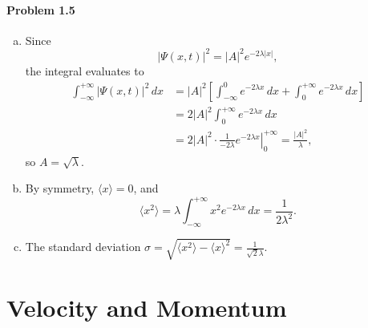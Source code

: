 \documentclass{article}
\begin{document}
\paragraph{Problem 1.5}
\begin{enumerate}[(a)]
  \item Since \[
      |\Psi(x, t)|^2 = |A|^2 e^{-2 \lambda |x|},
    \] the integral evaluates to
    \begin{align*}
      \int_{-\infty}^{+\infty} |\Psi(x, t)|^2 \,dx
      &= |A|^2 \left[
        \int_{-\infty}^0 e^{-2 \lambda x} \,dx +
        \int_0^{+\infty} e^{-2 \lambda x} \,dx
      \right] \\
      &= 2|A|^2 \int_0^{+\infty} e^{-2 \lambda x} \,dx \\
      &= 2|A|^2 \cdot \left.
        \frac{1}{-2\lambda} e^{-2 \lambda x}
      \right|_0^{+\infty} = \frac{|A|^2}{\lambda},
    \end{align*}
    so $A = \sqrt{\lambda}$.
  \item By symmetry, $\langle x \rangle = 0$, and
    \begin{equation*}
      \langle x^2 \rangle
      = \lambda \int_{-\infty}^{+\infty} x^2 e^{-2 \lambda x} \,dx
      = \frac{1}{2\lambda^2}.
    \end{equation*}
  \item The standard deviation $\sigma = \sqrt{\langle x^2 \rangle -
    \langle x \rangle^2} = \frac{1}{\sqrt{2} \lambda}$.
\end{enumerate}

\section{Velocity and Momentum}
\end{document}
